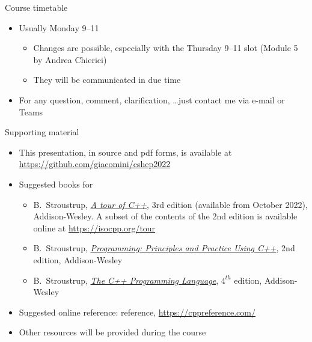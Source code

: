 
\begin{frame}{Course timetable}
  \begin{itemize}
  \item Usually Monday 9--11

    \begin{itemize}
    \item Changes are possible, especially with the Thursday 9--11 slot (Module 5 by Andrea Chierici)
    \item They will be communicated in due time
    \end{itemize}
  \item For any question, comment, clarification, \ldots just contact me via e-mail or Teams
  \end{itemize}
\end{frame}

\begin{frame}{Supporting material}

  \begin{itemize}

  \item This presentation, in source and pdf forms, is available at \url{https://github.com/giacomini/cshep2022}

  \item Suggested books for \Cpp{}
    \begin{itemize}
      \item B.~Stroustrup, \href{https://stroustrup.com/tour3.html}{\textit{A tour of C++}}, 3rd edition (available from
      October 2022), Addison-Wesley. A subset of the contents of the 2nd edition is available online at
      \url{https://isocpp.org/tour}
  
      \item B.~Stroustrup,
      \href{https://stroustrup.com/programming.html}{\textit{Programming:
          Principles and Practice Using C++}}, 2nd edition, Addison-Wesley

    \item B.~Stroustrup, \href{https://stroustrup.com/4th.html}{\textit{The C++
          Programming Language}}, $4^{th}$ edition, Addison-Wesley
    \end{itemize}

  \item Suggested online reference: \Cpp{} reference, \url{https://cppreference.com/}

  \item Other resources will be provided during the course
  \end{itemize}
\end{frame}

